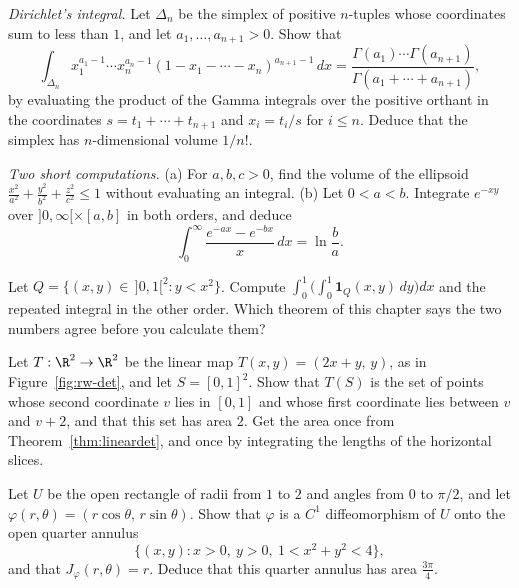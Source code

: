 \begin{exercise}[$\star\star\star$]\label{ex:simplex}
\emph{Dirichlet's integral.} Let $\Delta_n$ be the simplex of positive $n$-tuples whose coordinates sum to less than $1$, and let $a_1,\dots,a_{n+1}>0$. Show that
\[\int_{\Delta_n}x_1^{a_1-1}\cdots x_n^{a_n-1}(1-x_1-\cdots-x_n)^{a_{n+1}-1}\,dx=\frac{\Gamma(a_1)\cdots\Gamma(a_{n+1})}{\Gamma(a_1+\cdots+a_{n+1})},\]
by evaluating the product of the Gamma integrals over the positive orthant in the coordinates $s=t_1+\cdots+t_{n+1}$ and $x_i=t_i/s$ for $i\le n$. Deduce that the simplex has $n$-dimensional volume $1/n!$.
\end{exercise}

\begin{exercise}[$\star$]\label{ex:frullani}
\emph{Two short computations.} (a) For $a,b,c>0$, find the volume of the ellipsoid $\frac{x^2}{a^2}+\frac{y^2}{b^2}+\frac{z^2}{c^2}\le 1$ without evaluating an integral. (b) Let $0<a<b$. Integrate $e^{-xy}$ over $]0,\infty[\times[a,b]$ in both orders, and deduce
\[
\int_0^\infty\frac{e^{-ax}-e^{-bx}}{x}\,dx=\ln\frac ba.
\]
\end{exercise}

\begin{exercise}[$\star$]\label{ex:v7c09a}
Let $Q=\{(x,y)\in\,]0,1[^2:y<x^2\}$. Compute $\int_0^1\bigl(\int_0^1\mathbf 1_Q(x,y)\,dy\bigr)dx$ and the repeated integral in the other order. Which theorem of this chapter says the two numbers agree before you calculate them?
\end{exercise}

\begin{exercise}[$\star\star$]\label{ex:v7c09b}
Let $T:\R^2\to\R^2$ be the linear map $T(x,y)=(2x+y,\,y)$, as in Figure~\ref{fig:rw-det}, and let $S=[0,1]^2$. Show that $T(S)$ is the set of points whose second coordinate $v$ lies in $[0,1]$ and whose first coordinate lies between $v$ and $v+2$, and that this set has area $2$. Get the area once from Theorem~\ref{thm:lineardet}, and once by integrating the lengths of the horizontal slices.
\end{exercise}

\begin{exercise}[$\star\star$]\label{ex:v7c09c}
Let $U$ be the open rectangle of radii from $1$ to $2$ and angles from $0$ to $\pi/2$, and let $\varphi(r,\theta)=(r\cos\theta,\,r\sin\theta)$. Show that $\varphi$ is a $C^1$ diffeomorphism of $U$ onto the open quarter annulus
\[
\{(x,y):x>0,\ y>0,\ 1<x^2+y^2<4\},
\]
and that $J_\varphi(r,\theta)=r$. Deduce that this quarter annulus has area $\frac{3\pi}4$.
\end{exercise}

